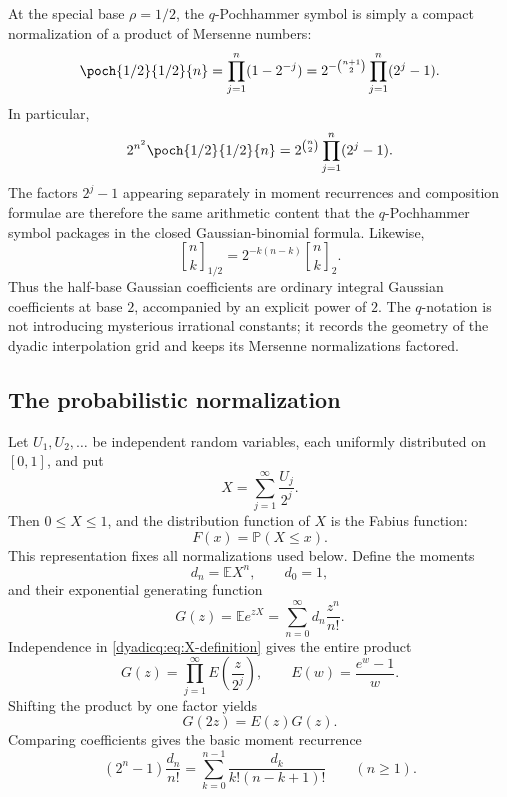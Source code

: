 \documentclass[11pt,oneside]{article}
\theoremstyle{definition}
\theoremstyle{remark}
\newcommand{\E}{\mathbb E}
\newcommand{\Prob}{\mathbb P}
\newcommand{\qbinom}[3]{\genfrac{[}{]}{0pt}{}{#1}{#2}_{#3}}
\begin{document}
At the special base $\rho=1/2$, the $q$-Pochhammer symbol is simply a compact
normalization of a product of Mersenne numbers:
\begin{equation}\label{dyadicq:eq:Mersenne-Pochhammer}
 \poch{1/2}{1/2}{n}
 =\prod_{j=1}^{n}(1-2^{-j})
 =2^{-\binom{n+1}{2}}\prod_{j=1}^{n}(2^j-1).
\end{equation}
In particular,
\begin{equation}\label{dyadicq:eq:main-denom-Mersenne}
 2^{n^2}\poch{1/2}{1/2}{n}
 =2^{\binom n2}\prod_{j=1}^{n}(2^j-1).
\end{equation}
The factors $2^j-1$ appearing separately in moment recurrences and
composition formulae are therefore the same arithmetic content that the
$q$-Pochhammer symbol packages in the closed Gaussian-binomial formula.
Likewise,
\begin{equation}\label{dyadicq:eq:qbinomial-inversion}
 \qbinom{n}{k}{1/2}
 =2^{-k(n-k)}\qbinom{n}{k}{2}.
\end{equation}
Thus the half-base Gaussian coefficients are ordinary integral Gaussian
coefficients at base $2$, accompanied by an explicit power of $2$.  The
$q$-notation is not introducing mysterious irrational constants; it records
the geometry of the dyadic interpolation grid and keeps its Mersenne
normalizations factored.

\subsection{The probabilistic normalization}

Let $U_1,U_2,\ldots$ be independent random variables, each uniformly
distributed on $[0,1]$, and put
\begin{equation}\label{dyadicq:eq:X-definition}
  X=\sum_{j=1}^{\infty}\frac{U_j}{2^j}.
\end{equation}
Then $0\le X\le1$, and the distribution function of $X$ is the Fabius
function:
\[
  F(x)=\Prob(X\le x).
\]
This representation fixes all normalizations used below.  Define the moments
\begin{equation}\label{dyadicq:eq:dn-definition}
  d_n=\E X^n,
  \qquad d_0=1,
\end{equation}
and their exponential generating function
\begin{equation}\label{dyadicq:eq:G-definition}
  G(z)=\E e^{zX}=\sum_{n=0}^{\infty}d_n\frac{z^n}{n!}.
\end{equation}
Independence in \eqref{dyadicq:eq:X-definition} gives the entire product
\begin{equation}\label{dyadicq:eq:G-product}
  G(z)=\prod_{j=1}^{\infty}E\!\left(\frac{z}{2^j}\right),
  \qquad
  E(w)=\frac{e^w-1}{w}.
\end{equation}
Shifting the product by one factor yields
\begin{equation}\label{dyadicq:eq:G-dilation}
  G(2z)=E(z)G(z).
\end{equation}
Comparing coefficients gives the basic moment recurrence
\begin{equation}\label{dyadicq:eq:moment-recurrence}
  (2^n-1)\frac{d_n}{n!}
  =\sum_{k=0}^{n-1}\frac{d_k}{k!(n-k+1)!}
  \qquad(n\ge1).
\end{equation}
\end{document}
